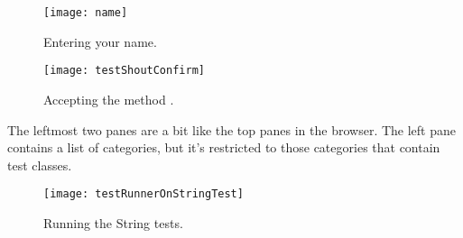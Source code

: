 \documentclass[a4paper,10pt,twoside]{book}
\begin{document}

\begin{figure}[htb]
\centerline {\texttt{[image: name]}}
\caption{Entering your name.}
\end{figure}

\begin{figure}[htb]
\centerline {\texttt{[image: testShoutConfirm]}}
\caption{Accepting the  method .}
\end{figure}




The leftmost two panes are a bit like the top panes in the browser.  The left pane contains a list of categories, but it's restricted to those categories that contain test classes.


\begin{figure}[hbt]
\centerline {\texttt{[image: testRunnerOnStringTest]}}
\caption{Running the String tests.
}
\end{figure}
\end{document}
